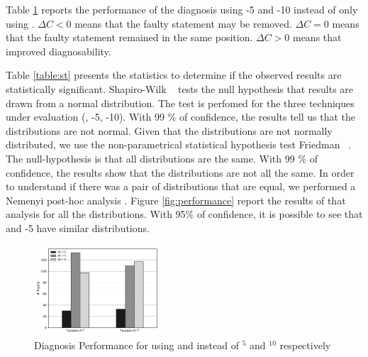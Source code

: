 \documentclass{article}
\begin{document}
Table \ref{fig:diagnosis} reports the performance of the diagnosis using \comb{}-5 and \comb{}-10 instead of only using \sfl{}. $\Delta C <0$ means that the faulty statement may be removed. $\Delta C=0$ means that the faulty statement remained in the same position. $\Delta C >0$ means that \ds{} improved diagnosability.


Table \ref{table:st} presents the statistics to determine if the observed results are statistically significant. Shapiro-Wilk ~\cite{10.2307/2333709} tests the null hypothesis that results are drawn from a normal distribution. The test is perfomed for the three techniques under evaluation (\sfl{}, \comb{}-5, \comb{}-10). With 99 \% of confidence, the results tell us that the distributions are not normal. Given that the distributions are not normally distributed, we use the non-parametrical statistical hypothesis test Friedman ~\cite{10.2307/2279372}. The null-hypothesis is that all distributions are the same. With 99 \% of confidence, the results show that the distributions are not all the same. In order to understand if there was a pair of distributions that are equal, we performed a Nemenyi post-hoc analysis . Figure \ref{fig:performance} report the results of that analysis for all the distributions. With 95\% of confidence, it is possible to see that \sfl{} and \comb{}-5 have similar distributions.


%

\begin{figure}[h]
		\centering
		\includegraphics[width=0.42\textwidth]{figures/performance.pdf}
		\caption{Diagnosis Performance for using  and  instead of \sfl{}$^{5}$ and \sfl{}$^{10}$ respectively}
		\label{fig:diagnosis}
\end{figure}
\end{document}
